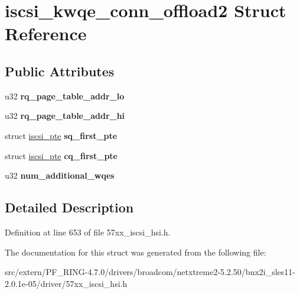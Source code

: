 \hypertarget{structiscsi__kwqe__conn__offload2}{
\section{iscsi\_\-kwqe\_\-conn\_\-offload2 Struct Reference}
\label{structiscsi__kwqe__conn__offload2}
}
\subsection*{Public Attributes}
\begin{DoxyCompactItemize}
\item 
\hypertarget{structiscsi__kwqe__conn__offload2_a5d091cc83feca360862d0a66d47d3d1b}{
u32 {\bfseries rq\_\-page\_\-table\_\-addr\_\-lo}}
\label{structiscsi__kwqe__conn__offload2_a5d091cc83feca360862d0a66d47d3d1b}

\item 
\hypertarget{structiscsi__kwqe__conn__offload2_aa1227b7bef0c7a3b9c7340465eeda50a}{
u32 {\bfseries rq\_\-page\_\-table\_\-addr\_\-hi}}
\label{structiscsi__kwqe__conn__offload2_aa1227b7bef0c7a3b9c7340465eeda50a}

\item 
\hypertarget{structiscsi__kwqe__conn__offload2_aba930af4b3f1b8290e642528122dd5bb}{
struct \hyperlink{structiscsi__pte}{iscsi\_\-pte} {\bfseries sq\_\-first\_\-pte}}
\label{structiscsi__kwqe__conn__offload2_aba930af4b3f1b8290e642528122dd5bb}

\item 
\hypertarget{structiscsi__kwqe__conn__offload2_aead14cabe22350f236ff8388a4841e09}{
struct \hyperlink{structiscsi__pte}{iscsi\_\-pte} {\bfseries cq\_\-first\_\-pte}}
\label{structiscsi__kwqe__conn__offload2_aead14cabe22350f236ff8388a4841e09}

\item 
\hypertarget{structiscsi__kwqe__conn__offload2_a7ffbb79111115a9e76182b1a07e0bc23}{
u32 {\bfseries num\_\-additional\_\-wqes}}
\label{structiscsi__kwqe__conn__offload2_a7ffbb79111115a9e76182b1a07e0bc23}

\end{DoxyCompactItemize}


\subsection{Detailed Description}


Definition at line 653 of file 57xx\_\-iscsi\_\-hsi.h.



The documentation for this struct was generated from the following file:\begin{DoxyCompactItemize}
\item 
src/extern/PF\_\-RING-\/4.7.0/drivers/broadcom/netxtreme2-\/5.2.50/bnx2i\_\-sles11-\/2.0.1e-\/05/driver/57xx\_\-iscsi\_\-hsi.h\end{DoxyCompactItemize}
